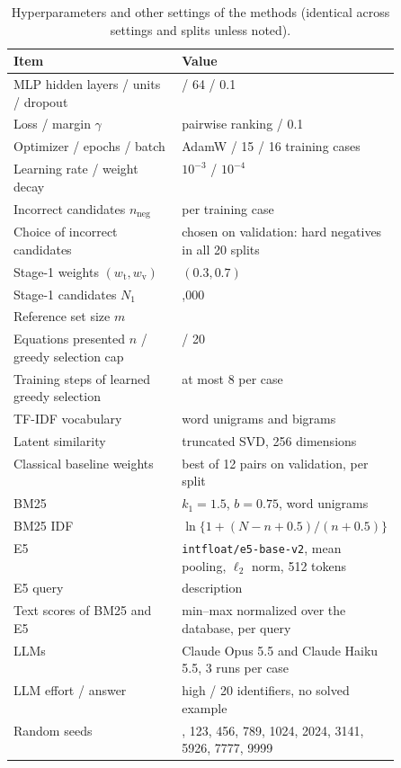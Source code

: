 \begin{table}[h]\centering
\caption{Hyperparameters and other settings of the methods (identical across settings and splits
unless noted).}
\label{tab:hyper}
\small
\begin{tabular}{l>{\raggedright\arraybackslash}p{0.5\linewidth}}
\toprule
Item & Value \\
\midrule
MLP hidden layers / units / dropout & 2 / 64 / 0.1 \\
Loss / margin $\gamma$ & pairwise ranking / 0.1 \\
Optimizer / epochs / batch & AdamW / 15 / 16 training cases \\
Learning rate / weight decay & $10^{-3}$ / $10^{-4}$ \\
Incorrect candidates $n_{\mathrm{neg}}$ & 8 per training case \\
Choice of incorrect candidates & chosen on validation: hard negatives in all 20 splits \\
Stage-1 weights $(w_{\mathrm{t}}, w_{\mathrm{v}})$ & $(0.3, 0.7)$ \\
Stage-1 candidates $N_1$ & 2,000 \\
Reference set size $m$ & 5 \\
Equations presented $n$ / greedy selection cap & 20 / 20 \\
Training steps of learned greedy selection & at most 8 per case \\
TF-IDF vocabulary & word unigrams and bigrams \\
Latent similarity & truncated SVD, 256 dimensions \\
Classical baseline weights & best of 12 pairs on validation, per split \\
BM25 & $k_1 = 1.5$, $b = 0.75$, word unigrams \\
BM25 IDF & $\ln\{1 + (N - n + 0.5)/(n + 0.5)\}$ \\
E5 & \texttt{intfloat/e5-base-v2}, mean pooling, $\ell_2$ norm, 512 tokens \\
E5 query & description \\
Text scores of BM25 and E5 & min--max normalized over the database, per query \\
LLMs & Claude Opus 5.5 and Claude Haiku 5.5, 3 runs per case \\
LLM effort / answer & high / 20 identifiers, no solved example \\
Random seeds & 42, 123, 456, 789, 1024, 2024, 3141, 5926, 7777, 9999 \\
\bottomrule
\end{tabular}
\end{table}

